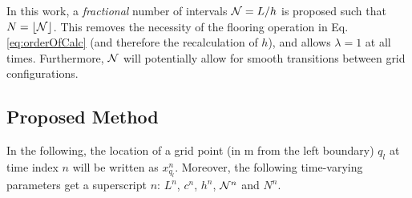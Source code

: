 \documentclass[fleqn]{jaes}
\begin{document}
In this work, a \textit{fractional} number of intervals $\mathcal{N} = L / h$ is proposed such that $N = \floor[\Nfrac]$. This removes the necessity of the flooring operation in Eq. \eqref{eq:orderOfCalc} (and therefore the recalculation of $h$), and allows $\lambda = 1$ at all times. Furthermore, $\mathcal{N}$ will potentially allow for smooth transitions between grid configurations. 

\subsection{Proposed Method}
In the following, the location of a grid point (in m from the left boundary) $q_l$ at time index $n$ will be written as $x_{q_l}^n$. Moreover, the following time-varying parameters get a superscript $n$: $L^n$, $c^n$, $h^n$, $\mathcal{N}^n$ and $N^n$.%
\end{document}
